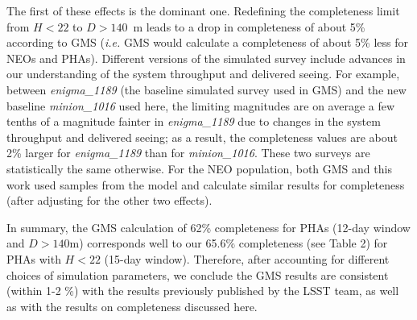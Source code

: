 The first of these effects is the dominant one.  Redefining the completeness limit from $H<22$ to $D>140$~m leads to a drop in completeness of about 5\% according to GMS ({\it i.e.} GMS would calculate a completeness of about 5\% less for NEOs and PHAs).
Different versions of the simulated survey include advances in our understanding of the system throughput and delivered seeing. For example, between {\it enigma\_1189} (the baseline simulated survey used in GMS) and the new baseline {\it minion\_1016} used here, the limiting magnitudes are on average a few tenths of a magnitude fainter in {\it enigma\_1189} due to changes in the system throughput and delivered seeing; as a result, the completeness values are about 2\% larger for {\it enigma\_1189} than for {\it minion\_1016}.
These two surveys are statistically the same otherwise.
For the NEO population, both GMS and this work used samples from the \cite{Grav2011} model and calculate similar results for completeness (after adjusting for the other two effects).

In summary, the GMS calculation of 62\% completeness for PHAs (12-day window and $D>140$m) corresponds
well to our 65.6\% completeness (see Table 2) for PHAs with $H<22$ (15-day window).  Therefore, after accounting
for different choices of simulation parameters, we conclude the GMS results are consistent (within 1-2 \%)
with the results previously published by the LSST team, as well as with the results on completeness discussed here.

